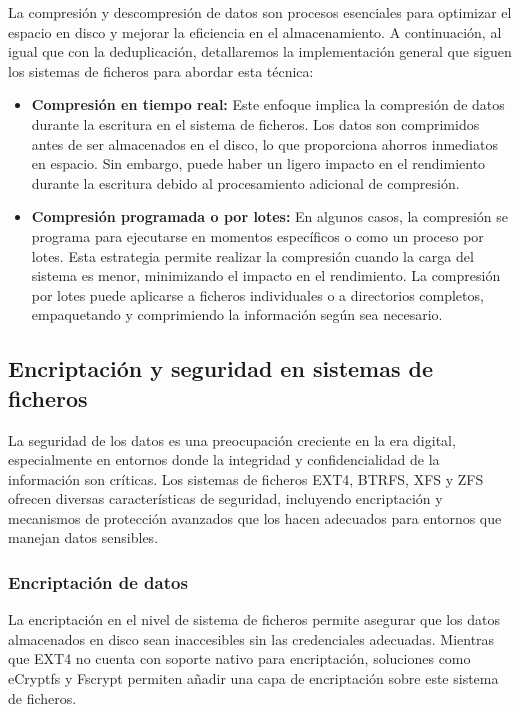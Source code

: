 La compresión y descompresión de datos son procesos esenciales para optimizar el espacio en disco y mejorar la eficiencia en el almacenamiento. A continuación, al igual que con la deduplicación, detallaremos la implementación general que siguen los sistemas de ficheros para abordar esta técnica:

\begin{itemize}
    \item \textbf{Compresión en tiempo real:}
    Este enfoque implica la compresión de datos durante la escritura en el sistema de ficheros. Los datos son comprimidos antes de ser almacenados en el disco, lo que proporciona ahorros inmediatos en espacio. Sin embargo, puede haber un ligero impacto en el rendimiento durante la escritura debido al procesamiento adicional de compresión.
    
    \item \textbf{Compresión programada o por lotes:}
    En algunos casos, la compresión se programa para ejecutarse en momentos específicos o como un proceso por lotes. Esta estrategia permite realizar la compresión cuando la carga del sistema es menor, minimizando el impacto en el rendimiento. La compresión por lotes puede aplicarse a ficheros individuales o a directorios completos, empaquetando y comprimiendo la información según sea necesario. 
\end{itemize}

\subsection{Encriptación y seguridad en sistemas de ficheros}

La seguridad de los datos es una preocupación creciente en la era digital, especialmente en entornos donde la integridad y confidencialidad de la información son críticas. Los sistemas de ficheros EXT4, BTRFS, XFS y ZFS ofrecen diversas características de seguridad, incluyendo encriptación y mecanismos de protección avanzados que los hacen adecuados para entornos que manejan datos sensibles.

\subsubsection{Encriptación de datos}

La encriptación en el nivel de sistema de ficheros permite asegurar que los datos almacenados en disco sean inaccesibles sin las credenciales adecuadas. Mientras que EXT4 no cuenta con soporte nativo para encriptación, soluciones como eCryptfs y Fscrypt permiten añadir una capa de encriptación sobre este sistema de ficheros.\\

